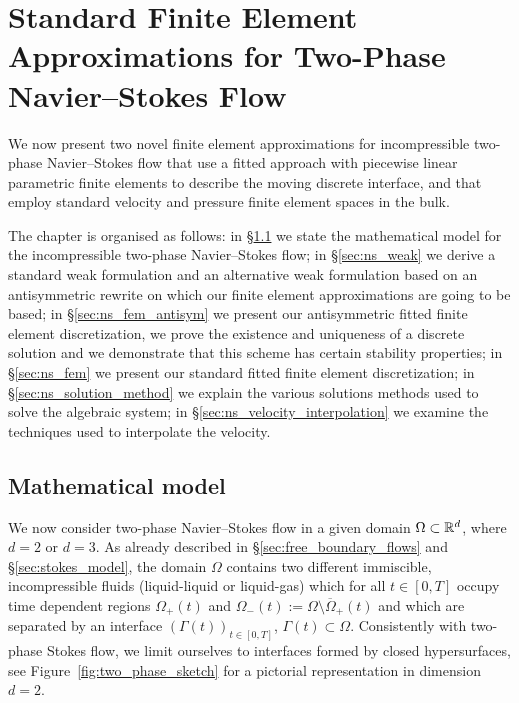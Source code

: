 \chapter[Two-Phase Navier--Stokes Flow Standard FEMs]
{\sc Standard Finite Element Approximations for Two-Phase Navier--Stokes
Flow}\label{ch:navier_stokes}
We now present two novel finite element approximations for incompressible
two-phase Navier--Stokes flow that use a fitted approach with piecewise linear
parametric finite elements to describe the moving discrete interface, and that
employ standard velocity and pressure finite element spaces in the bulk.

The chapter is organised as follows: in \S\ref{sec:ns_model} we
state the mathematical model for the incompressible two-phase Navier--Stokes
flow; in \S\ref{sec:ns_weak} we derive a standard weak formulation
and an alternative weak formulation based on an antisymmetric rewrite on which
our finite element approximations are going to be based; in
\S\ref{sec:ns_fem_antisym} we present our antisymmetric fitted finite element
discretization, we prove the existence and uniqueness of a discrete solution
and we demonstrate that this scheme has certain stability properties;
in \S\ref{sec:ns_fem} we present our standard fitted finite element
discretization; in \S\ref{sec:ns_solution_method} we explain the various
solutions methods used to solve the algebraic system; in
\S\ref{sec:ns_velocity_interpolation} we examine the techniques used to
interpolate the velocity.

\section{Mathematical model}\label{sec:ns_model}
We now consider two-phase Navier--Stokes flow in a given domain
$\Omega\subset\mathbb R^d$, where $d=2$ or $d=3$. As already described in
\S\ref{sec:free_boundary_flows} and \S\ref{sec:stokes_model}, the domain
$\Omega$ contains two different immiscible, incompressible fluids
(liquid-liquid or liquid-gas) which for all $t\in[0,T]$ occupy time
dependent regions $\Omega_+(t)$ and
$\Omega_-(t):=\Omega\setminus\overline{\Omega}_+(t)$ and which are separated by
an interface $(\Gamma(t))_{t\in[0,T]}$, $\Gamma(t)\subset\Omega$.
Consistently with two-phase Stokes flow, we limit ourselves to interfaces
formed by closed hypersurfaces, see Figure~\ref{fig:two_phase_sketch}
for a pictorial representation in dimension $d=2$.

